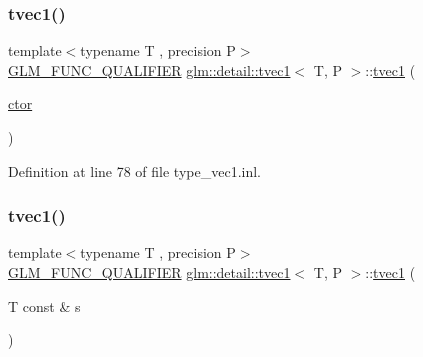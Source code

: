 \mbox{\label{structglm_1_1detail_1_1tvec1_a52af6de6e305cdb9769a58fe40c9d0ae}} 
\subsubsection{\texorpdfstring{tvec1()}{tvec1()}\hspace{0.1cm}{\footnotesize\ttfamily [4/14]}}
{\footnotesize\ttfamily template$<$typename T , precision P$>$ \\
\hyperlink{setup_8hpp_a33fdea6f91c5f834105f7415e2a64407}{G\+L\+M\+\_\+\+F\+U\+N\+C\+\_\+\+Q\+U\+A\+L\+I\+F\+I\+ER} \hyperlink{structglm_1_1detail_1_1tvec1}{glm\+::detail\+::tvec1}$<$ T, P $>$\+::\hyperlink{structglm_1_1detail_1_1tvec1}{tvec1} (\begin{DoxyParamCaption}\item[{\hyperlink{structglm_1_1detail_1_1tvec1_a33f1783ca537d8dad5624e5adcf6bd5a}{ctor}}]{ }\end{DoxyParamCaption})\hspace{0.3cm}{\ttfamily [explicit]}}



Definition at line 78 of file type\+\_\+vec1.\+inl.

\mbox{\label{structglm_1_1detail_1_1tvec1_adf94a9b437d8033044ea754fbbb18614}} 
\subsubsection{\texorpdfstring{tvec1()}{tvec1()}\hspace{0.1cm}{\footnotesize\ttfamily [5/14]}}
{\footnotesize\ttfamily template$<$typename T , precision P$>$ \\
\hyperlink{setup_8hpp_a33fdea6f91c5f834105f7415e2a64407}{G\+L\+M\+\_\+\+F\+U\+N\+C\+\_\+\+Q\+U\+A\+L\+I\+F\+I\+ER} \hyperlink{structglm_1_1detail_1_1tvec1}{glm\+::detail\+::tvec1}$<$ T, P $>$\+::\hyperlink{structglm_1_1detail_1_1tvec1}{tvec1} (\begin{DoxyParamCaption}\item[{T const \&}]{s }\end{DoxyParamCaption})}



